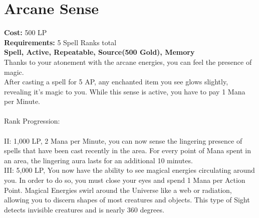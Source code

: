 \section{Arcane Sense}\label{spell:arcaneSense}
\textbf{Cost:} 500 LP\\
\textbf{Requirements:} 5 Spell Ranks total\\
\textbf{Spell, Active, Repeatable, Source(500 Gold), Memory}\\
Thanks to your atonement with the arcane energies, you can feel the presence of magic.\\
After casting a spell for 5 AP, any enchanted item you see glows slightly, revealing it's magic to you.
While this sense is active, you have to pay 1 Mana per Minute.\\
\\
Rank Progression:\\
\\
II: 1,000 LP, 2 Mana per Minute, you can now sense the lingering presence of spells that have been cast recently in the area.
For every point of Mana spent in an area, the lingering aura lasts for an additional 10 minutes.\\
III: 5,000 LP, You now have the ability to see magical energies circulating around you.
In order to do so, you must close your eyes and spend 1 Mana per Action Point.
Magical Energies swirl around the Universe like a web or radiation, allowing you to discern shapes of most creatures and objects.
This type of Sight detects invisible creatures and is nearly 360 degrees.\\